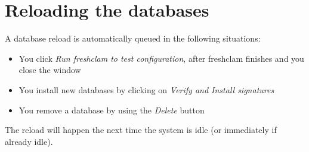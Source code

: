 \section{Reloading the databases}
\label{sec:updatenow}
A database reload is automatically queued in the following situations:
\begin{itemize}
\item You click \emph{Run freshclam to test configuration}, after freshclam
finishes and you close the window
\item You install new databases by clicking on \emph{Verify and Install
    signatures}
\item You remove a database by using the \emph{Delete} button
\end{itemize}

The reload will happen the next time the system is idle (or immediately if
already idle).
